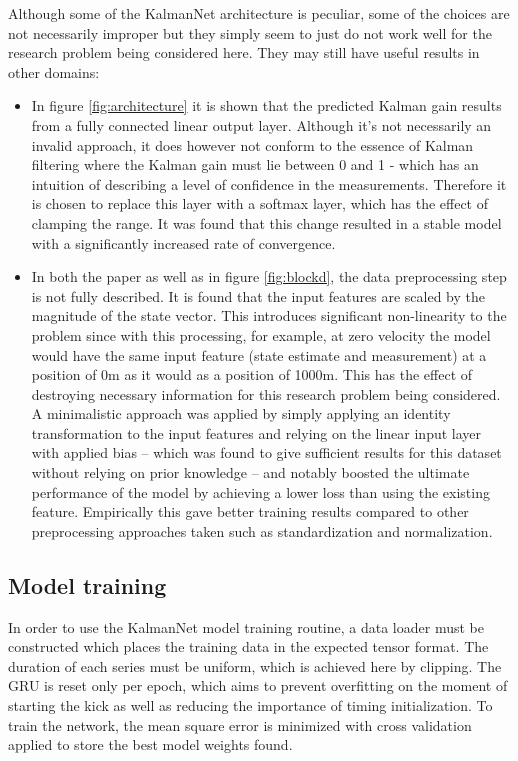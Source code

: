 \documentclass[a4paper,twoside,12pt]{report}
\begin{document}
Although some of the KalmanNet architecture is peculiar, some of the choices are not necessarily improper but they simply seem to just do not work well for the research problem being considered here. They may still have useful results in other domains:
\begin{itemize}
    \item In figure \ref{fig:architecture} it is shown that the predicted Kalman gain results from a fully connected linear output layer. Although it's not necessarily an invalid approach, it does however not conform to the essence of Kalman filtering where the Kalman gain must lie between 0 and 1 - which has an intuition of describing a level of confidence in the measurements. Therefore it is chosen to replace this layer with a softmax layer, which has the effect of clamping the range. It was found that this change resulted in a stable model with a significantly increased rate of convergence.
    \item In both the \cite{kalmannet} paper as well as in figure \ref{fig:blockd}, the data preprocessing step is not fully described. It is found that the input features are scaled by the magnitude of the state vector. This introduces significant non-linearity to the problem since with this processing, for example, at zero velocity the model would have the same input feature (state estimate and measurement) at a position of 0m as it would as a position of 1000m. This has the effect of destroying necessary information for this research problem being considered. A minimalistic approach was applied by simply applying an identity transformation to the input features and relying on the linear input layer with applied bias -- which was found to give sufficient results for this dataset without relying on prior knowledge -- and notably boosted the ultimate performance of the model by achieving a lower loss than using the existing feature. Empirically this gave better training results compared to other preprocessing approaches taken such as standardization and normalization.
\end{itemize}


\subsection{Model training}

In order to use the KalmanNet model training routine, a data loader must be constructed which places the training data in the expected tensor format. The duration of each series must be uniform, which is achieved here by clipping. The GRU is reset only per epoch, which aims to prevent overfitting on the moment of starting the kick as well as reducing the importance of timing initialization. To train the network, the mean square error is minimized with cross validation applied to store the best model weights found.
\end{document}
